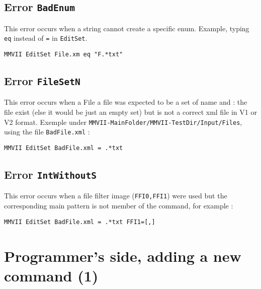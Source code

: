 \documentclass[a4paper]{book}
\newcommand{\MMVIDIR}{{\tt MMVII-MainFolder/}}
\begin{document}
{\subsection{Error {\tt BadEnum}}

This error occurs when a string cannot create a specific enum.
Example, typing {\tt eq} instead of {\tt =} in {\tt EditSet}.

\begin{verbatim}
MMVII EditSet File.xm eq "F.*txt"
\end{verbatim}



\subsection{Error {\tt FileSetN}}

This error occurs when a File a file was expected to be a set of name and : 
the file exist (else it would be just an empty set) but is not a correct
xml file in V1 or V2 format. Exemple under {\tt {\MMVIDIR}MMVII-TestDir/Input/Files},
using the file {\tt BadFile.xml} :

\begin{verbatim}
MMVII EditSet BadFile.xml = .*txt
\end{verbatim}


\subsection{Error {\tt IntWithoutS}}

This error occurs when a file filter image ({\tt FFI0,FFI1}) were used but
the corresponding main pattern is not member of the command, for example :

\begin{verbatim}
MMVII EditSet BadFile.xml = .*txt FFI1=[,]
\end{verbatim}



\section{Programmer's side, adding a new command (1)}

}
\end{document}
